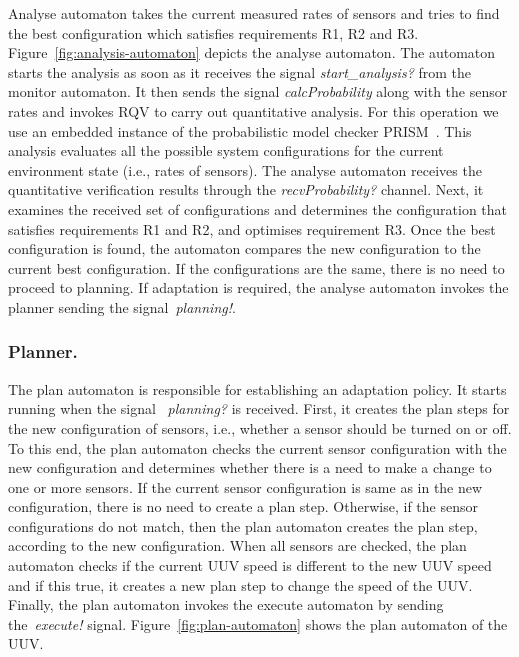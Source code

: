Analyse automaton takes the current measured rates of sensors and tries to find the best configuration which satisfies requirements R1, R2 and R3. Figure~\ref{fig:analysis-automaton} depicts the analyse automaton. The automaton starts the analysis as soon as it receives the signal \textit{start\_analysis?} from the monitor automaton. It then
sends the signal \textit{calcProbability} along with the sensor rates and invokes RQV to carry out quantitative analysis. For this operation we use an embedded instance of the probabilistic model checker PRISM~\cite{Kwiatkowska2011:CAV}. This analysis evaluates all the possible system configurations for the current environment state (i.e., rates of sensors). The analyse automaton receives the quantitative verification results through the \textit{recvProbability?} channel. Next, it examines the received set of configurations and determines the configuration that satisfies requirements R1 and R2, and optimises requirement R3. Once the best configuration is found, the automaton compares the new configuration to the current best configuration. If the configurations are the same, there is no need to proceed to planning. If adaptation is required, the analyse automaton invokes the planner sending the signal~\textit{planning!}.


\subsubsection{Planner.}
The plan automaton is responsible for establishing an adaptation policy. It starts running when the signal ~\textit{planning?} is received. First, it  creates the plan steps for the new configuration of sensors, i.e., whether a sensor should be turned on or off. To this end, the plan automaton checks the current sensor configuration with the new configuration and determines whether there is a need to make a change to one or more sensors. If the current sensor configuration is same as in the new configuration, there is no need to create a plan step. Otherwise, if the sensor configurations do not match, then the plan automaton creates the plan step, according to the new configuration. When all sensors are checked, the plan automaton checks  if the current UUV speed is different to the new UUV speed and if this true, it creates a new plan step to change the speed of the UUV. Finally, the plan automaton invokes the execute automaton by sending the~\textit{execute!} signal. Figure~\ref{fig:plan-automaton} shows the plan automaton of the UUV.

